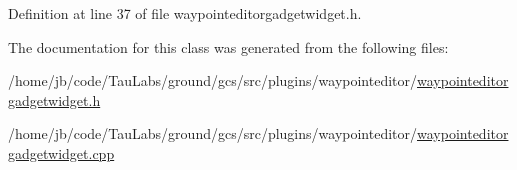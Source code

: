 \-Definition at line 37 of file waypointeditorgadgetwidget.\-h.



\-The documentation for this class was generated from the following files\-:\begin{DoxyCompactItemize}
\item 
/home/jb/code/\-Tau\-Labs/ground/gcs/src/plugins/waypointeditor/\hyperlink{waypointeditorgadgetwidget_8h}{waypointeditorgadgetwidget.\-h}\item 
/home/jb/code/\-Tau\-Labs/ground/gcs/src/plugins/waypointeditor/\hyperlink{waypointeditorgadgetwidget_8cpp}{waypointeditorgadgetwidget.\-cpp}\end{DoxyCompactItemize}
